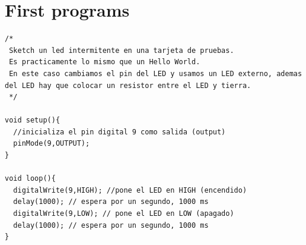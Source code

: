 \documentclass[fontsize=10pt,paper=letter,DIV=8]{article}
\begin{document}
\section{First programs}

\begin{lstlisting}[style=Arduino]
 /*  
 Sketch un led intermitente en una tarjeta de pruebas. 
 Es practicamente lo mismo que un Hello World.
 En este caso cambiamos el pin del LED y usamos un LED externo, ademas del LED hay que colocar un resistor entre el LED y tierra. 
 */

void setup(){
  //inicializa el pin digital 9 como salida (output)
  pinMode(9,OUTPUT);
}

void loop(){
  digitalWrite(9,HIGH); //pone el LED en HIGH (encendido)
  delay(1000); // espera por un segundo, 1000 ms
  digitalWrite(9,LOW); // pone el LED en LOW (apagado)
  delay(1000); // espera por un segundo, 1000 ms
}
\end{lstlisting}
\end{document}
